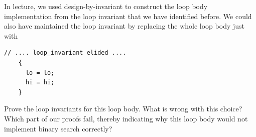 \begin{exercise}
  In lecture, we used design-by-invariant to construct the loop body
  implementation from the loop invariant that we have identified before.
  We could also have maintained the loop invariant by replacing the whole
  loop body just with
  \begin{lstlisting}[language={[C0]C}]
    // .... loop_invariant elided ....
    {
      lo = lo;
      hi = hi;
    }
  \end{lstlisting}
  Prove the loop invariants for this loop body.
  What is wrong with this choice? Which part of our proofs fail, thereby
  indicating why this loop body would not implement binary search correctly?
\end{exercise}

% 
% 

